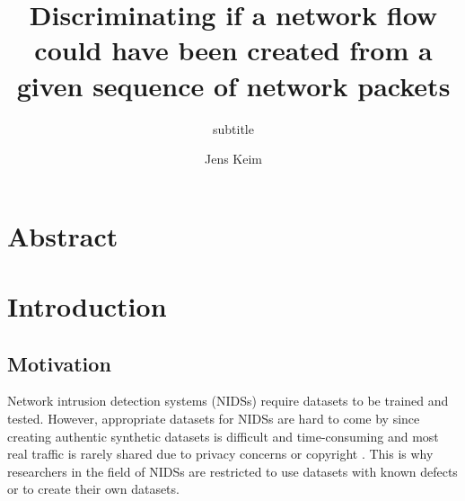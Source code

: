 \documentclass[
	ngerman,
	ruledheaders=section,%
	class=report,%
	thesis={type=bachelor},%
	accentcolor=9c,%
	custommargins=true,%
	marginpar=false,%
	parskip=half-,%
	fontsize=11pt,%
]{tudapub}
\begin{document}

\title{Discriminating if a network flow could have been created from a given sequence of network packets}
\subtitle{subtitle}
\author[J. Keim]{Jens Keim}%


\submissiondate{\today}
\examdate{\today}


\maketitle

\affidavit

\tableofcontents

\chapter{Abstract}

\chapter{Introduction}

\section{Motivation}

Network intrusion detection systems (NIDSs) require datasets to be trained and tested.
However, appropriate datasets for NIDSs are hard to come by
since creating authentic synthetic datasets is difficult and time-consuming
and most real traffic is rarely shared due to privacy concerns \cite{ringFlowbasedNetworkTraffic2019a} or copyright \cite{corderoID2TDIYDataset2015}.
This is why researchers in the field of NIDSs are restricted to use datasets with known defects or to create their own datasets.
\end{document}
